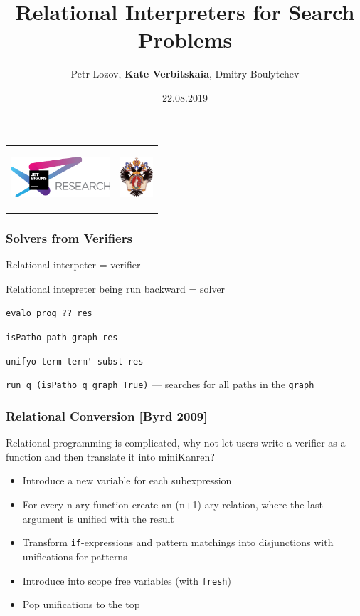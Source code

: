 \documentclass[xcolor=table]{beamer}
\title[Relational Interpreters for Search Problems]{Relational Interpreters for Search Problems}
\institute[JetBrains Research]{
JetBrains Research, Programming Languages and Tools Lab  \\
Saint Petersburg State University
}
\author[Kate Verbitskaia]{Petr Lozov, \textbf{Kate Verbitskaia}, Dmitry Boulytchev}
\date{22.08.2019}
\begin{document}
{
\begin{frame}[fragile]
  \begin{tabular}{p{5.5cm} p{5.5cm}}
   \begin{center}
      \includegraphics[height=1.5cm]{pictures/jetbrainsResearch.pdf}
    \end{center}
    &
    \begin{center}
      \includegraphics[height=1.5cm]{pictures/SPbGU_Logo.png}
    \end{center}
  \end{tabular}
  \titlepage
\end{frame}
}

\begin{frame}[fragile]
  \transwipe[direction=90]
  \frametitle{Solvers from Verifiers}

Relational interpeter = verifier 

Relational intepreter being run backward = solver

\lstinline{evalo prog ?? res}

\lstinline{isPatho path graph res} 

\lstinline{unifyo term term' subst res} 

\lstinline{run q (isPatho q graph True)} --- searches for all paths in the \lstinline{graph}

\end{frame}

\begin{frame}[fragile]
  \transwipe[direction=90]
  \frametitle{Relational Conversion [Byrd 2009]}

Relational programming is complicated, why not let users write a verifier as a function and then translate it into miniKanren?

\begin{itemize}
  \item Introduce a new variable for each subexpression
  \item For every n-ary function create an (n+1)-ary relation, where the last argument is unified with the result
  \item Transform \lstinline{if}-expressions and pattern matchings into disjunctions with unifications for patterns
  \item Introduce into scope free variables (with \lstinline{fresh})
  \item Pop unifications to the top
\end{itemize}
\end{frame}
\end{document}
